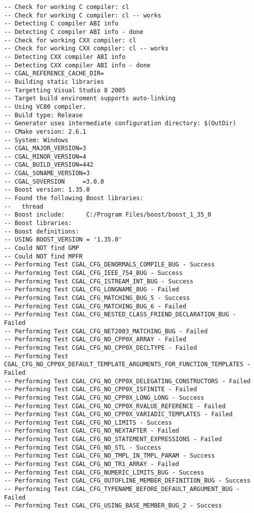 {\ccTexHtml{\scriptsize}{}
\begin{verbatim}
-- Check for working C compiler: cl
-- Check for working C compiler: cl -- works
-- Detecting C compiler ABI info
-- Detecting C compiler ABI info - done
-- Check for working CXX compiler: cl
-- Check for working CXX compiler: cl -- works
-- Detecting CXX compiler ABI info
-- Detecting CXX compiler ABI info - done
-- CGAL_REFERENCE_CACHE_DIR=
-- Building static libraries
-- Targetting Visual Studio 8 2005
-- Target build enviroment supports auto-linking
-- Using VC80 compiler.
-- Build type: Release
-- Generator uses intermediate configuration directory: $(OutDir)
-- CMake version: 2.6.1
-- System: Windows
-- CGAL_MAJOR_VERSION=3
-- CGAL_MINOR_VERSION=4
-- CGAL_BUILD_VERSION=442
-- CGAL_SONAME_VERSION=3
-- CGAL_SOVERSION     =3.0.0
-- Boost version: 1.35.0
-- Found the following Boost libraries:
--   thread
-- Boost include:      C:/Program Files/boost/boost_1_35_0
-- Boost libraries:    
-- Boost definitions:  
-- USING BOOST_VERSION = '1.35.0'
-- Could NOT find GMP
-- Could NOT find MPFR
-- Performing Test CGAL_CFG_DENORMALS_COMPILE_BUG - Success
-- Performing Test CGAL_CFG_IEEE_754_BUG - Success
-- Performing Test CGAL_CFG_ISTREAM_INT_BUG - Success
-- Performing Test CGAL_CFG_LONGNAME_BUG - Failed
-- Performing Test CGAL_CFG_MATCHING_BUG_5 - Success
-- Performing Test CGAL_CFG_MATCHING_BUG_6 - Failed
-- Performing Test CGAL_CFG_NESTED_CLASS_FRIEND_DECLARATION_BUG - Failed
-- Performing Test CGAL_CFG_NET2003_MATCHING_BUG - Failed
-- Performing Test CGAL_CFG_NO_CPP0X_ARRAY - Failed
-- Performing Test CGAL_CFG_NO_CPP0X_DECLTYPE - Failed
-- Performing Test CGAL_CFG_NO_CPP0X_DEFAULT_TEMPLATE_ARGUMENTS_FOR_FUNCTION_TEMPLATES - Failed
-- Performing Test CGAL_CFG_NO_CPP0X_DELEGATING_CONSTRUCTORS - Failed
-- Performing Test CGAL_CFG_NO_CPP0X_ISFINITE - Failed
-- Performing Test CGAL_CFG_NO_CPP0X_LONG_LONG - Success
-- Performing Test CGAL_CFG_NO_CPP0X_RVALUE_REFERENCE - Failed
-- Performing Test CGAL_CFG_NO_CPP0X_VARIADIC_TEMPLATES - Failed
-- Performing Test CGAL_CFG_NO_LIMITS - Success
-- Performing Test CGAL_CFG_NO_NEXTAFTER - Failed
-- Performing Test CGAL_CFG_NO_STATEMENT_EXPRESSIONS - Failed
-- Performing Test CGAL_CFG_NO_STL - Success
-- Performing Test CGAL_CFG_NO_TMPL_IN_TMPL_PARAM - Success
-- Performing Test CGAL_CFG_NO_TR1_ARRAY - Failed
-- Performing Test CGAL_CFG_NUMERIC_LIMITS_BUG - Success
-- Performing Test CGAL_CFG_OUTOFLINE_MEMBER_DEFINITION_BUG - Success
-- Performing Test CGAL_CFG_TYPENAME_BEFORE_DEFAULT_ARGUMENT_BUG - Failed
-- Performing Test CGAL_CFG_USING_BASE_MEMBER_BUG_2 - Success

\end{verbatim}}
